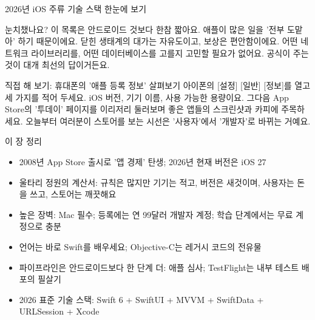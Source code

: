 \begin{center}\small\color{gray}2026년 iOS 주류 기술 스택 한눈에 보기\end{center}

눈치챘나요? 이 목록은 안드로이드 것보다 한참 짧아요. 애플이 많은 일을 '전부 도맡아' 하기 때문이에요. 닫힌 생태계의 대가는 자유도이고, 보상은 편안함이에요. 어떤 네트워크 라이브러리를, 어떤 데이터베이스를 고를지 고민할 필요가 없어요. 공식이 주는 것이 대개 최선의 답이거든요.

\begin{tcbpractice}{직접 해 보기: 휴대폰의 '애플 등록 정보' 살펴보기}
아이폰의 [설정] [일반] [정보]를 열고 세 가지를 적어 두세요. iOS 버전, 기기 이름, 사용 가능한 용량이요. 그다음 App Store의 '투데이' 페이지를 이리저리 둘러보며 좋은 앱들의 스크린샷과 카피에 주목하세요. 오늘부터 여러분이 스토어를 보는 시선은 '사용자'에서 '개발자'로 바뀌는 거예요.

\end{tcbpractice}

\begin{tcbsummary}{이 장 정리}
\begin{itemize}
  \item 2008년 App Store 출시로 '앱 경제' 탄생; 2026년 현재 버전은 iOS 27
  \item 울타리 정원의 계산서: 규칙은 많지만 기기는 적고, 버전은 새것이며, 사용자는 돈을 쓰고, 스토어는 깨끗해요
  \item 높은 장벽: Mac 필수; 등록에는 연 99달러 개발자 계정; 학습 단계에서는 무료 계정으로 충분
  \item 언어는 바로 Swift를 배우세요; Objective-C는 레거시 코드의 전유물
  \item 파이프라인은 안드로이드보다 한 단계 더: 애플 심사; TestFlight는 내부 테스트 배포의 필살기
  \item 2026 표준 기술 스택: Swift 6 + SwiftUI + MVVM + SwiftData + URLSession + Xcode
\end{itemize}

\end{tcbsummary}
